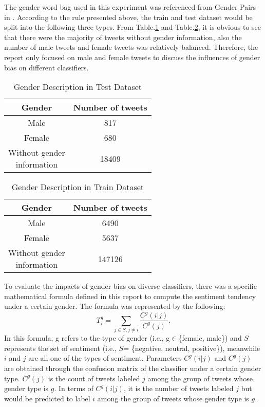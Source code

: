 \documentclass[11pt]{article}
\newcommand{\reft}[1]{Table.\ref{#1}}
\begin{document}
 The gender word bag used in this experiment was referenced from Gender Pairs in \cite{Lu2020GenderBI}. According to the rule presented above, the train and test dataset would be split into the following three types. From  \reft{genderTest}  and \reft{genderTrain}, it is obvious to see that there were the majority of tweets without gender information, also the number of male tweets and female tweets was relatively balanced. Therefore, the report only focused on male and female tweets to discuss the influences of gender bias on different classifiers.
 \begin{table}[h]
 \begin{center}
\begin{tabular}{|c|c|}
      \hline
      Gender & Number of tweets\\
      \hline\hline
      Male &817\\
      \hline
       Female & 680\\
       \hline
       \makecell[c]{Without gender\\ information}& 18409\\
      \hline
\end{tabular}
\caption{Gender Description in Test Dataset}\label{genderTest}
 \end{center}
\end{table}
\begin{table}[h]
 \begin{center}
\begin{tabular}{|c|c|}
      \hline
      Gender & Number of tweets\\
      \hline\hline
      Male &6490\\
      \hline
       Female & 5637\\
       \hline
       \makecell[c]{Without gender\\ information}& 147126\\
      \hline
\end{tabular}
\caption{Gender Description in Train Dataset}\label{genderTrain}
 \end{center}
\end{table}

To evaluate the impacts of gender bias on diverse classifiers, there was a specific mathematical formula defined in this report to compute the sentiment tendency under a certain gender.  The formula was represented by the following:
$$T^g_{i} = \sum_{j \in S, j\neq i} \frac{C^g(i|j)}{C^g(j)}.$$
In this formula, g refers to the type of gender (i.e., g$\in$\{female, male\}) and $S$ represents the set of sentiment (i.e., $S$= \{negative, neutral, positive\}), meanwhile $i$ and $j$ are all one of the types of sentiment. Parameters  $C^g(i|j)$ and $C^g(j)$ are obtained through the confusion matrix of the classifier under a certain gender type. $C^g(j)$ is the count of tweets labeled $j$ among the group of tweets whose gender type is $g$. In terms of $C^g(i|j)$, it is the number of tweets labeled $j$ but would be predicted to label $i$ among the group of tweets whose gender type is $g$. 
\end{document}

